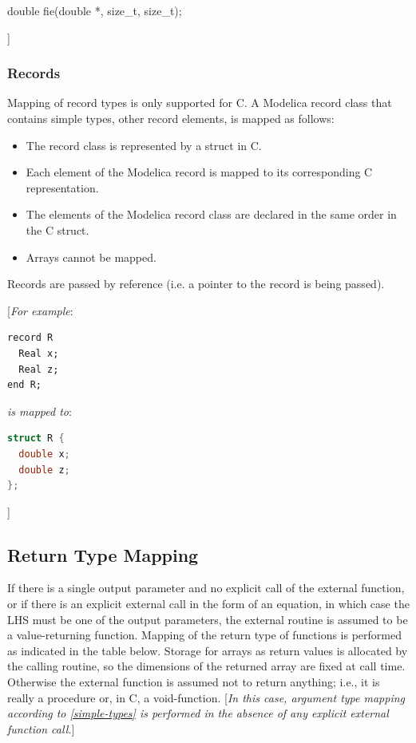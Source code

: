 \documentclass[10pt,a4paper]{report}
\def\doublelabel#1{\label{#1}}
\begin{document}
double fie(double *, size\_t, size\_t);

{]}

\subsubsection{Records}\doublelabel{records}

Mapping of record types is only supported for C. A Modelica record class
that contains simple types, other record elements, is mapped as follows:

\begin{itemize}
\item
  The record class is represented by a struct in C.
\item
  Each element of the Modelica record is mapped to its corresponding C
  representation.
\item
  The elements of the Modelica record class are declared in the same
  order in the C struct.
\item
  Arrays cannot be mapped.
\end{itemize}

Records are passed by reference (i.e. a pointer to the record is being
passed).

{[}\emph{For example}:

\begin{lstlisting}[language=modelica]
record R
  Real x;
  Real z;
end R;
\end{lstlisting}
\emph{is mapped to}:
\begin{lstlisting}[language=C]
struct R {
  double x;
  double z;
};
\end{lstlisting}

{]}

\subsection{Return Type Mapping}\doublelabel{return-type-mapping}

If there is a single output parameter and no explicit call of the
external function, or if there is an explicit external call in the form
of an equation, in which case the LHS must be one of the output
parameters, the external routine is assumed to be a value-returning
function. Mapping of the return type of functions is performed as
indicated in the table below. Storage for arrays as return values is
allocated by the calling routine, so the dimensions of the returned
array are fixed at call time. Otherwise the external function is assumed
not to return anything; i.e., it is really a procedure or, in C, a
void-function. {[}\emph{In this case, argument type mapping according to
\ref{simple-types} is performed in the absence of any explicit
external function call.}{]}
\end{document}
